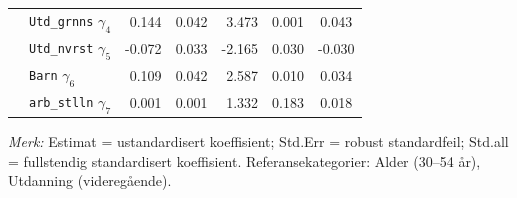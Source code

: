 \documentclass[
  12pt,
  a4paper,
  DIV=11,
  numbers=noendperiod]{scrartcl}
\begin{document}
\begin{table}[htbp]
\begin{tabular}{@{}llrrrrc@{}}
& \texttt{Utd\_grnns} $\gamma_4$        & 0.144 & 0.042 & 3.473  & 0.001   & 0.043 \\
& \texttt{Utd\_nvrst} $\gamma_5$        & -0.072& 0.033 & -2.165 & 0.030   & -0.030 \\
& \texttt{Barn} $\gamma_6$              & 0.109 & 0.042 & 2.587  & 0.010   & 0.034 \\
& \texttt{arb\_stlln} $\gamma_7$        & 0.001 & 0.001 & 1.332  & 0.183   & 0.018 \\
\bottomrule
\end{tabular}
\raggedright
\footnotesize{%
\textit{Merk:} Estimat = ustandardisert koeffisient; Std.Err = robust standardfeil; Std.all = fullstendig standardisert koeffisient. Referansekategorier: Alder (30–54 år), Utdanning (videregående).}
\end{table}
\end{document}
